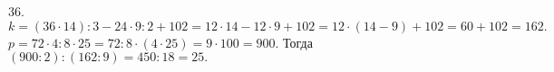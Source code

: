 36. $k=(36\cdot14):3-24\cdot9:2+102=12\cdot14-12\cdot9+102=12\cdot(14-9)+102=60+102=162.$ $p=72\cdot4:8\cdot25=72:8\cdot(4\cdot25)=9\cdot100=900.$ Тогда
$(900:2):(162:9)=450:18=25.$\\
